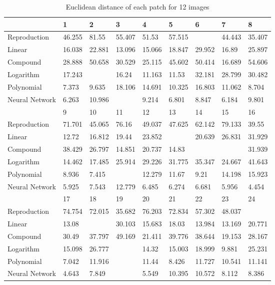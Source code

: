 \begin{table}[H]
  \begin{center}
  \resizebox{10cm}{!} {
    \begin{tabular}{|l |l |l |l |l |l |l |l |l |}\hline
          &1 &2 &3 &4 &5 &6 &7 &8\\ \hline 
        Reproduction &46.255 &81.55 &55.407 &51.53 &57.515 &\cellcolor{colorred}{81.625} &44.443 &35.407\\ 
        Linear &16.038 &22.881 &13.096 &15.066 &18.847 &29.952 &16.89 &25.897\\ 
        Compound &28.888 &50.658 &30.529 &25.115 &45.602 &50.414 &16.689 &54.606\\ 
        Logarithm &17.243 &\cellcolor{colorgreen}{7.025} &16.24 &11.163 &11.53 &32.181 &28.799 &30.482\\ 
        Polynomial &7.373 &9.635 &18.106 &14.691 &10.325 &16.803 &11.062 &8.704\\ 
        Neural Network &6.263 &10.986 &\cellcolor{colorred}{14.224} &9.214 &6.801 &8.847 &6.184 &9.801\\ \hline 
          &9 &10 &11 &12 &13 &14 &15 &16\\ \hline 
        Reproduction &71.701 &45.065 &76.16 &49.037 &47.625 &62.142 &79.133 &39.55\\ 
        Linear &12.72 &16.812 &19.44 &23.852 &\cellcolor{colorgreen}{6.643} &20.639 &26.831 &31.929\\ 
        Compound &38.429 &26.797 &14.851 &20.737 &14.83 &\cellcolor{colorgreen}{11.458} &\cellcolor{colorred}{58.521} &31.939\\ 
        Logarithm &14.462 &17.485 &25.914 &29.226 &31.775 &35.347 &24.667 &41.643\\ 
        Polynomial &8.936 &7.415 &\cellcolor{colorred}{25.399} &12.279 &11.67 &9.21 &14.198 &15.923\\ 
        Neural Network &5.925 &7.543 &12.779 &6.485 &6.274 &6.681 &5.956 &4.454\\ \hline 
          &17 &18 &19 &20 &21 &22 &23 &24\\ \hline 
        Reproduction &74.754 &72.015 &35.682 &76.203 &72.834 &57.302 &48.037 &\cellcolor{colorgreen}{26.947}\\ 
        Linear &13.08 &\cellcolor{colorred}{38.257} &30.103 &15.683 &18.03 &13.984 &13.169 &20.771\\ 
        Compound &30.49 &37.797 &49.169 &21.411 &39.776 &38.644 &19.153 &28.167\\ 
        Logarithm &15.098 &26.777 &\cellcolor{colorred}{55.118} &14.32 &15.003 &18.999 &9.881 &25.231\\ 
        Polynomial &7.042 &11.916 &\cellcolor{colorgreen}{5.536} &11.44 &8.426 &11.727 &10.541 &11.141\\ 
        Neural Network &4.643 &7.849 &\cellcolor{colorgreen}{2.495} &5.549 &10.395 &10.572 &8.112 &8.386\\ \hline 
    \end{tabular}
  }
  \caption{Euclidean distance of each patch for 12 images }
  \end{center}
\end{table}
